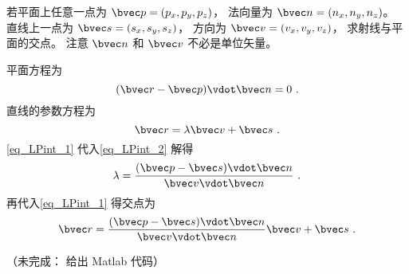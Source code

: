 

若平面上任意一点为 $\bvec p = (p_x, p_y, p_z)$， 法向量为 $\bvec n = (n_x, n_y, n_z)$。 直线上一点为 $\bvec s = (s_x, s_y, s_z)$， 方向为 $\bvec v = (v_x, v_y, v_z)$， 求射线与平面的交点。 注意 $\bvec n$ 和 $\bvec v$ 不必是单位矢量。

平面方程为
\begin{equation}\label{eq_LPint_2}
(\bvec r - \bvec p) \vdot \bvec n = 0~.
\end{equation}
直线的参数方程为
\begin{equation}\label{eq_LPint_1}
\bvec r = \lambda \bvec v + \bvec s~.
\end{equation}
\autoref{eq_LPint_1} 代入\autoref{eq_LPint_2} 解得
\begin{equation}
\lambda = \frac{(\bvec p - \bvec s)\vdot \bvec n}{\bvec v \vdot \bvec n}~.
\end{equation}
再代入\autoref{eq_LPint_1} 得交点为
\begin{equation}\label{eq_LPint_3}
\bvec r = \frac{(\bvec p - \bvec s)\vdot \bvec n}{\bvec v \vdot \bvec n} \bvec v + \bvec s~.
\end{equation}

（未完成： 给出 Matlab 代码）
